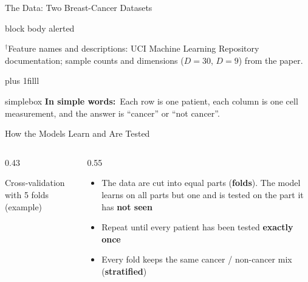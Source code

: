 \documentclass[aspectratio=169,11pt,t,xcolor={table}]{beamer}
\newcommand{\insimple}[1]{%
  \par\vskip 0pt plus 1filll
  \begin{beamercolorbox}[wd=\textwidth,sep=4pt,rounded=true]{simplebox}%
    \small\textbf{\textcolor{qamber!75!black}{In simple words:}}\ #1%
  \end{beamercolorbox}\vskip1pt}
\begin{document}
\begin{frame}{The Data: Two Breast-Cancer Datasets}
\begin{beamercolorbox}[wd=\textwidth,sep=4pt,rounded=true]{block body alerted}
  \end{beamercolorbox}
  \vspace{1mm}
  {\tiny\color{qgray}$^{\dagger}$Feature names and descriptions: UCI Machine Learning Repository documentation; sample counts and dimensions ($D=30$, $D=9$) from the paper.\par}
  \insimple{Each row is one patient, each column is one cell measurement, and the answer is ``cancer'' or ``not cancer''.}
\end{frame}

\begin{frame}{How the Models Learn and Are Tested}
  \begin{columns}[T,onlytextwidth]
    \begin{column}{0.43\textwidth}
      \centering
      \par
      \vspace{1mm}
      {\scriptsize Cross-validation with 5 folds (example)}
    \end{column}
    \begin{column}{0.55\textwidth}
      \footnotesize
      \begin{itemize}\setlength{\itemsep}{3pt}
        \item The data are cut into equal parts (\textbf{folds}). The model learns on all parts but one and is tested on the part it has \textbf{not seen}
        \item Repeat until every patient has been tested \textbf{exactly once}
        \item Every fold keeps the same cancer / non-cancer mix (\textbf{stratified})

\end{itemize}
\end{column}
\end{columns}
\end{frame}
\end{document}

